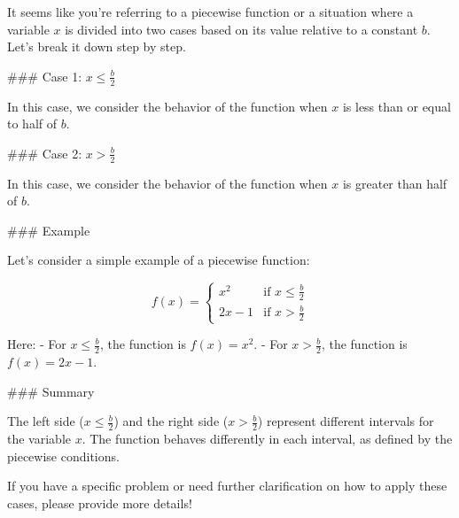 It seems like you're referring to a piecewise function or a situation where a variable \( x \) is divided into two cases based on its value relative to a constant \( b \). Let's break it down step by step.

### Case 1: \( x \leq \frac{b}{2} \)

In this case, we consider the behavior of the function when \( x \) is less than or equal to half of \( b \).

### Case 2: \( x > \frac{b}{2} \)

In this case, we consider the behavior of the function when \( x \) is greater than half of \( b \).

### Example

Let's consider a simple example of a piecewise function:

\[ f(x) = \begin{cases} 
x^2 & \text{if } x \leq \frac{b}{2} \\
2x - 1 & \text{if } x > \frac{b}{2}
\end{cases} \]

Here:
- For \( x \leq \frac{b}{2} \), the function is \( f(x) = x^2 \).
- For \( x > \frac{b}{2} \), the function is \( f(x) = 2x - 1 \).

### Summary

The left side (\( x \leq \frac{b}{2} \)) and the right side (\( x > \frac{b}{2} \)) represent different intervals for the variable \( x \). The function behaves differently in each interval, as defined by the piecewise conditions.

If you have a specific problem or need further clarification on how to apply these cases, please provide more details!